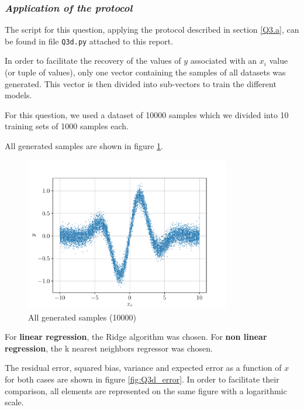 \subsubsection{{\it Application of the protocol}}
The script for this question, applying the protocol described in section \ref{Q3.a}, can be found in file \texttt{Q3d.py} attached to this report.\par
In order to facilitate the recovery of the values of $y$ associated with an $x_i$ value (or tuple of values), only one vector containing the samples of all datasets was generated. This vector is then divided into sub-vectors to train the different models.\par
For this question, we used a dataset of \num{10000} samples which we divided into \num{10} training sets of \num{1000} samples each.\par
All generated samples are shown in figure \ref{fig:Q3d_data}.
\begin{figure}[H]
    \centering
    \includegraphics[width=0.8\textwidth]{resources/pdf/Q3d_data.pdf}
    \caption{All generated samples (\num{10000})}
    \label{fig:Q3d_data}
\end{figure}
For {\bf linear regression}, the Ridge algorithm was chosen. For {\bf non linear regression}, the k nearest neighbors regressor was chosen.\par
The residual error, squared bias, variance and expected error as a function of $x$ for both cases are shown in figure \ref{fig:Q3d_error}. In order to facilitate their comparison, all elements are represented on the same figure with a logarithmic scale.
